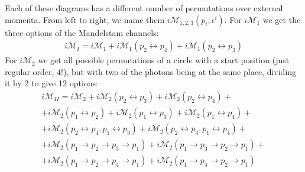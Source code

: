 \documentclass{article}
\begin{document}
\begin{center}
\end{center}
Each of these diagrams has a different number of permutations over external momenta. From left to right, we name them $i\mathcal{M}_{1,2,3}(p_i, \epsilon^i)$.
For $i\mathcal{M}_1$ we get the three options of the Mandelstam channels:
\begin{equation}
\begin{gathered}
    i\mathcal{M}_{I} = i\mathcal{M}_1
    + i\mathcal{M}_1(p_2 \leftrightarrow p_4)
    + i\mathcal{M}_1(p_2 \leftrightarrow p_3)
\end{gathered}
\end{equation}
For $i\mathcal{M}_2$ we get all possible permutations of a circle with a start position (just regular order, $4!$), but with two of the photons being at the same place, dividing it by 2 to give 12 options:
\begin{equation}
\begin{gathered}
    i\mathcal{M}_{II} = i\mathcal{M}_2
    + i\mathcal{M}_2(p_2 \leftrightarrow p_3)
    + i\mathcal{M}_2(p_2 \leftrightarrow p_4)
    + \\
    + i\mathcal{M}_2(p_1 \leftrightarrow p_2)
    + i\mathcal{M}_2(p_1 \leftrightarrow p_3)
    + i\mathcal{M}_2(p_1 \leftrightarrow p_4)
    + \\
    + i\mathcal{M}_2(p_2 \leftrightarrow p_4, p_1 \leftrightarrow p_3)
    + i\mathcal{M}_2(p_2 \leftrightarrow p_3, p_1 \leftrightarrow p_4)
    + \\
    + i\mathcal{M}_2(p_1 \rightarrow p_2 \rightarrow p_3 \rightarrow p_1)
    + i\mathcal{M}_2(p_1 \rightarrow p_3 \rightarrow p_2 \rightarrow p_1)
    + \\
    + i\mathcal{M}_2(p_1 \rightarrow p_2 \rightarrow p_4 \rightarrow p_1)
    + i\mathcal{M}_2(p_1 \rightarrow p_4 \rightarrow p_2 \rightarrow p_1)
\end{gathered}
\end{equation}
\end{document}
